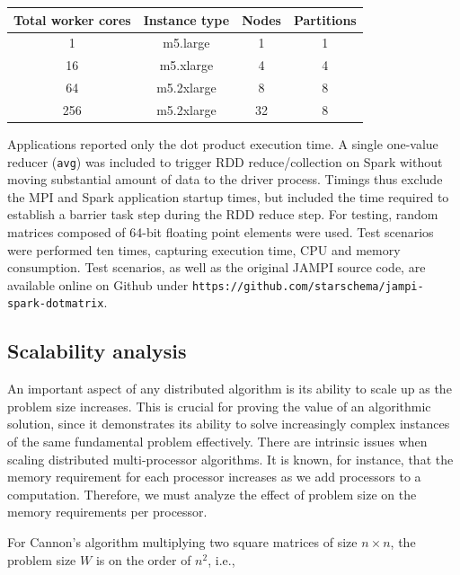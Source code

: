 \documentclass[fleqn,10pt]{SelfArx} %
\begin{document}
\begin{center}
	\begin{tabular}{ |c|c|c|c| } 
	 \hline
	 Total worker cores & Instance type & Nodes & Partitions  \\ 
	 \hline\hline
	 1 & m5.large & 1 & 1 \\ 
	 \hline
	 16 & m5.xlarge & 4 & 4 \\ 
	 \hline
	 64 & m5.2xlarge & 8 & 8 \\ 
	 \hline
	 256 & m5.2xlarge & 32 & 8 \\ 
	 \hline
	\end{tabular}
\end{center}
	

Applications reported only the dot product execution time. A single one-value reducer (\texttt{avg}) was included to trigger RDD reduce/collection on Spark without moving substantial amount of data to the driver process. Timings thus exclude the MPI and Spark application startup times, but included the time required to establish a barrier task step during the RDD reduce step. For testing, random matrices composed of 64-bit floating point elements were used. Test scenarios were performed ten times, capturing execution time, CPU and memory consumption. Test scenarios, as well as the original JAMPI source code, are available online on Github under \texttt{https://github.com/starschema/jampi-spark-dotmatrix}.


\subsection{Scalability analysis} %
\label{sub:scalability_analysis}


An important aspect of any distributed algorithm is its ability to scale up as the problem size increases. This is crucial for proving the value of an algorithmic solution, since it demonstrates its ability to solve increasingly complex instances of the same fundamental problem effectively. There are intrinsic issues when scaling distributed multi-processor algorithms. It is known, for instance, that the memory requirement for each processor increases as we add processors to a computation. Therefore, we must analyze the effect of problem size on the memory requirements per processor. 

For Cannon's algorithm multiplying two square matrices of size $n \times n$, the problem size $W$ is on the order of $n^2$, i.e.,
\end{document}
